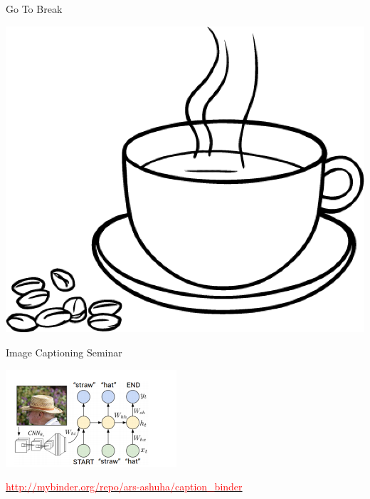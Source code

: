 \documentclass{beamer}
\begin{document}
\begin{frame}{Go To Break}
		\begin{center}
			\includegraphics[scale=0.25]{img/cof.png}
		\end{center}
\end{frame}


\begin{frame}{Image Captioning Seminar}
	
	\begin{center}
				  \includegraphics[scale=1.0]{img/ic3}
				
				  \href{http://mybinder.org/repo/ars-ashuha/caption_binder}{\textcolor{red}{http://mybinder.org/repo/ars-ashuha/caption\_binder}}
	\end{center}
\end{frame}
\end{document}
